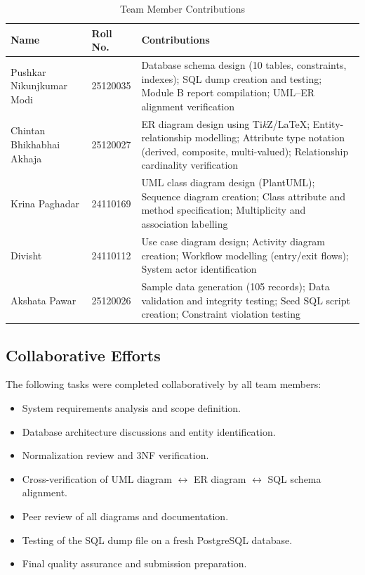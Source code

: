 \documentclass[a4paper, 12pt]{article}
\begin{document}
\begin{table}[H]
\centering
\caption{Team Member Contributions}
\label{tab:contributions}
\begin{tabularx}{\textwidth}{l l X}
\toprule
\textbf{Name} & \textbf{Roll No.} & \textbf{Contributions} \\
\midrule
Pushkar Nikunjkumar Modi & 25120035 &
Database schema design (10 tables, constraints, indexes); SQL dump creation and testing; Module B report compilation; UML--ER alignment verification \\
\addlinespace
Chintan Bhikhabhai Akhaja & 25120027 &
ER diagram design using Ti\textit{k}Z/\LaTeX; Entity-relationship modelling; Attribute type notation (derived, composite, multi-valued); Relationship cardinality verification \\
\addlinespace
Krina Paghadar & 24110169 &
UML class diagram design (PlantUML); Sequence diagram creation; Class attribute and method specification; Multiplicity and association labelling \\
\addlinespace
Divisht & 24110112 &
Use case diagram design; Activity diagram creation; Workflow modelling (entry/exit flows); System actor identification \\
\addlinespace
Akshata Pawar & 25120026 &
Sample data generation (105 records); Data validation and integrity testing; Seed SQL script creation; Constraint violation testing \\
\bottomrule
\end{tabularx}
\end{table}

\subsection{Collaborative Efforts}

The following tasks were completed collaboratively by all team members:
\begin{itemize}[leftmargin=*, nosep]
    \item System requirements analysis and scope definition.
    \item Database architecture discussions and entity identification.
    \item Normalization review and 3NF verification.
    \item Cross-verification of UML diagram $\leftrightarrow$ ER diagram $\leftrightarrow$ SQL schema alignment.
    \item Peer review of all diagrams and documentation.
    \item Testing of the SQL dump file on a fresh PostgreSQL database.
    \item Final quality assurance and submission preparation.
\end{itemize}
\end{document}
